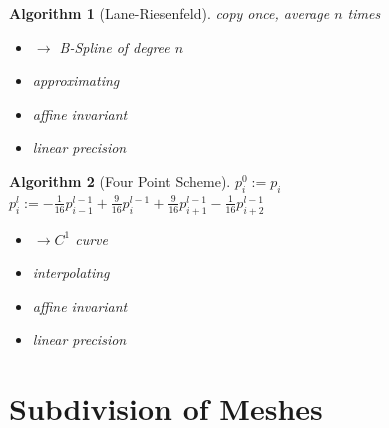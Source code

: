 \documentclass[conference]{IEEEtran}
\newtheorem{algorithm}{Algorithm}
\begin{document}
\begin{algorithm}[Lane-Riesenfeld]
	copy once, average $n$ times
	
	
	\begin{itemize}
		\item $\rightarrow$ B-Spline of degree $n$
		\item approximating
		\item affine invariant
		\item linear precision
	\end{itemize}
\end{algorithm}

\begin{algorithm}[Four Point Scheme]
	$p_i^0 := p_i$\\
	$p_i^l := -\frac{1}{16} p_{i-1}^{l-1} + \frac{9}{16} p_i^{l-1} + \frac{9}{16} p_{i+1}^{l-1} - \frac{1}{16} p_{i+2}^{l-1}$
	
	
	\begin{itemize}
		\item $\rightarrow C^1$ curve
		\item interpolating
		\item affine invariant
		\item linear precision
	\end{itemize}
\end{algorithm}

\section{Subdivision of Meshes}
\end{document}
